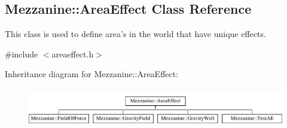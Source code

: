 \hypertarget{classMezzanine_1_1AreaEffect}{
\subsection{Mezzanine::AreaEffect Class Reference}
\label{classMezzanine_1_1AreaEffect}
}


This class is used to define area's in the world that have unique effects.  




{\ttfamily \#include $<$areaeffect.h$>$}

Inheritance diagram for Mezzanine::AreaEffect:\begin{figure}[H]
\begin{center}
\leavevmode
\includegraphics[height=1.717791cm]{classMezzanine_1_1AreaEffect}
\end{center}
\end{figure}
